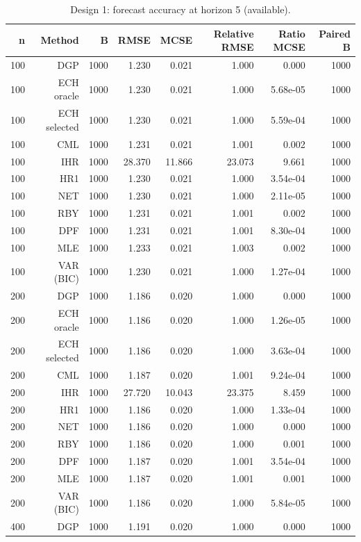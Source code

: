 \begin{table}[p]\centering
\caption{Design 1: forecast accuracy at horizon 5 (available).}
\small
\begin{tabular}{rrrrrrrr}\toprule
n & Method & B & RMSE & MCSE & Relative RMSE & Ratio MCSE & Paired B \\\midrule
100 & DGP & 1000 & 1.230 & 0.021 & 1.000 & 0.000 & 1000 \\
100 & ECH oracle & 1000 & 1.230 & 0.021 & 1.000 & 5.68e-05 & 1000 \\
100 & ECH selected & 1000 & 1.230 & 0.021 & 1.000 & 5.59e-04 & 1000 \\
100 & CML & 1000 & 1.231 & 0.021 & 1.001 & 0.002 & 1000 \\
100 & IHR & 1000 & 28.370 & 11.866 & 23.073 & 9.661 & 1000 \\
100 & HR1 & 1000 & 1.230 & 0.021 & 1.000 & 3.54e-04 & 1000 \\
100 & NET & 1000 & 1.230 & 0.021 & 1.000 & 2.11e-05 & 1000 \\
100 & RBY & 1000 & 1.231 & 0.021 & 1.001 & 0.002 & 1000 \\
100 & DPF & 1000 & 1.231 & 0.021 & 1.001 & 8.30e-04 & 1000 \\
100 & MLE & 1000 & 1.233 & 0.021 & 1.003 & 0.002 & 1000 \\
100 & VAR (BIC) & 1000 & 1.230 & 0.021 & 1.000 & 1.27e-04 & 1000 \\
200 & DGP & 1000 & 1.186 & 0.020 & 1.000 & 0.000 & 1000 \\
200 & ECH oracle & 1000 & 1.186 & 0.020 & 1.000 & 1.26e-05 & 1000 \\
200 & ECH selected & 1000 & 1.186 & 0.020 & 1.000 & 3.63e-04 & 1000 \\
200 & CML & 1000 & 1.187 & 0.020 & 1.001 & 9.24e-04 & 1000 \\
200 & IHR & 1000 & 27.720 & 10.043 & 23.375 & 8.459 & 1000 \\
200 & HR1 & 1000 & 1.186 & 0.020 & 1.000 & 1.33e-04 & 1000 \\
200 & NET & 1000 & 1.186 & 0.020 & 1.000 & 0.000 & 1000 \\
200 & RBY & 1000 & 1.186 & 0.020 & 1.000 & 0.001 & 1000 \\
200 & DPF & 1000 & 1.187 & 0.020 & 1.001 & 3.54e-04 & 1000 \\
200 & MLE & 1000 & 1.187 & 0.020 & 1.001 & 0.001 & 1000 \\
200 & VAR (BIC) & 1000 & 1.186 & 0.020 & 1.000 & 5.84e-05 & 1000 \\
400 & DGP & 1000 & 1.191 & 0.020 & 1.000 & 0.000 & 1000 \\

\end{tabular}
\end{table}
